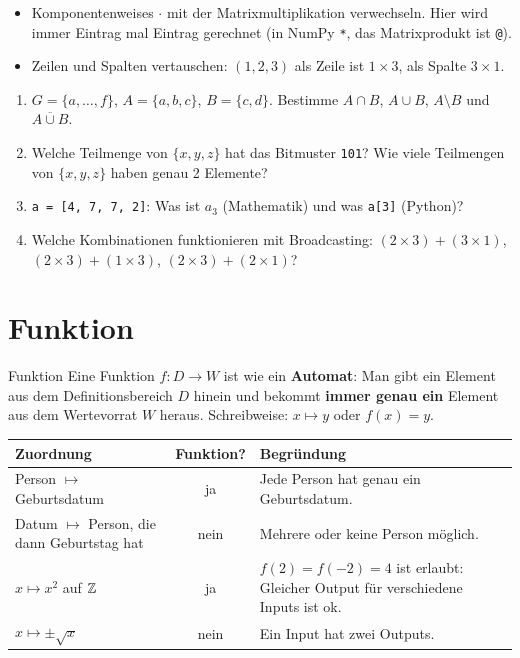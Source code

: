 \begin{fehler}
  \begin{itemize}[nosep]
    \item Komponentenweises $\cdot$ mit der Matrixmultiplikation verwechseln. Hier wird
          immer Eintrag mal Eintrag gerechnet (in NumPy \texttt{*}, das Matrixprodukt
          ist \texttt{@}).
    \item Zeilen und Spalten vertauschen: $(1, 2, 3)$ als Zeile ist $1 \times 3$, als
          Spalte $3 \times 1$.
  \end{itemize}
\end{fehler}

\begin{minicheck}
  \begin{enumerate}[resume*=fragen01]
    \item $G = \{a, \ldots, f\}$, $A = \{a,b,c\}$, $B = \{c,d\}$. Bestimme $A \cap B$,
          $A \cup B$, $A \setminus B$ und $\overline{A \cup B}$.
    \item Welche Teilmenge von $\{x,y,z\}$ hat das Bitmuster \texttt{101}? Wie viele
          Teilmengen von $\{x,y,z\}$ haben genau 2 Elemente?
    \item \texttt{a = [4, 7, 7, 2]}: Was ist $a_3$ (Mathematik) und was \texttt{a[3]} (Python)?
    \item Welche Kombinationen funktionieren mit Broadcasting:
          $(2\times3) + (3\times1)$, \; $(2\times3) + (1\times3)$, \; $(2\times3) + (2\times1)$?
  \end{enumerate}
\end{minicheck}

\section{Funktion}

\begin{definition}{Funktion}
  Eine Funktion $f\colon D \to W$ ist wie ein \textbf{Automat}: Man gibt ein Element aus
  dem Definitionsbereich $D$ hinein und bekommt \textbf{immer genau ein} Element aus dem
  Wertevorrat $W$ heraus. Schreibweise: $x \mapsto y$ oder $f(x) = y$.
\end{definition}

\begin{center}
  \renewcommand{\arraystretch}{1.25}
  \begin{tabularx}{\linewidth}{@{}l c X@{}}
    \toprule
    Zuordnung & Funktion? & Begründung \\
    \midrule
    Person $\mapsto$ Geburtsdatum & ja & Jede Person hat genau ein Geburtsdatum. \\
    Datum $\mapsto$ Person, die dann Geburtstag hat & nein & Mehrere oder keine Person möglich. \\
    $x \mapsto x^2$ auf $\mathbb{Z}$ & ja & $f(2) = f(-2) = 4$ ist erlaubt: Gleicher Output für verschiedene Inputs ist ok. \\
    $x \mapsto \pm\sqrt{x}$ & nein & Ein Input hat zwei Outputs. \\
    \bottomrule
  \end{tabularx}
\end{center}

